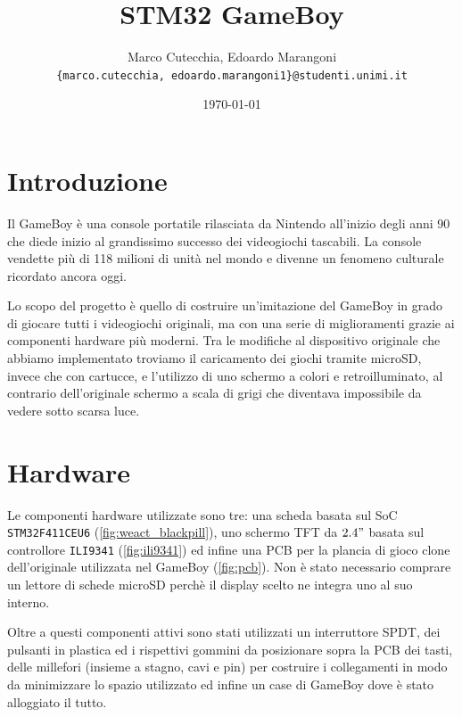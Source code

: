 \documentclass[hidelinks,12pt]{article}
\title{STM32 GameBoy}
\date{\today}
\author{Marco Cutecchia, Edoardo Marangoni \\
\footnotesize \texttt{\{marco.cutecchia, edoardo.marangoni1\}@studenti.unimi.it} \\ }
\begin{document}
\maketitle

\section{Introduzione}
Il GameBoy è una console portatile rilasciata da Nintendo all'inizio degli anni
90 che diede inizio al grandissimo successo dei videogiochi tascabili.
La console vendette più di 118 milioni di unità nel mondo e divenne un fenomeno
culturale ricordato ancora oggi.

Lo scopo del progetto è quello di costruire un'imitazione del GameBoy in grado
di giocare tutti i videogiochi originali, ma con una serie di miglioramenti
grazie ai componenti hardware più moderni. Tra le modifiche al dispositivo
originale che abbiamo implementato troviamo il caricamento dei giochi tramite
microSD, invece che con cartucce, e l'utilizzo di uno schermo a colori e
retroilluminato, al contrario dell'originale schermo a scala di grigi che
diventava impossibile da vedere sotto scarsa luce.

\section{Hardware}
Le componenti hardware utilizzate sono tre: una scheda basata sul
SoC \texttt{STM32F411CEU6} (\cref{fig:weact_blackpill}),
uno schermo TFT da $2.4"$ basata sul controllore \texttt{ILI9341}
(\cref{fig:ili9341}) ed infine una PCB per la plancia di gioco clone
dell'originale utilizzata nel GameBoy (\cref{fig:pcb}).
Non è stato necessario comprare un lettore di schede microSD perchè il
display scelto ne integra uno al suo interno.

Oltre a questi componenti attivi sono stati utilizzati un interruttore SPDT,
dei pulsanti in plastica ed i rispettivi gommini da posizionare sopra la PCB
dei tasti, delle millefori (insieme a stagno, cavi e pin) per costruire i
collegamenti in modo da minimizzare lo spazio utilizzato ed infine un case di
GameBoy dove è stato alloggiato il tutto.
\end{document}
